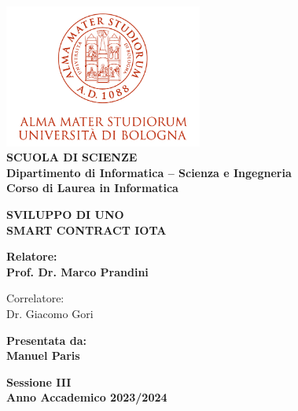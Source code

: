 \begin{titlepage}
\begin{center}
\includegraphics[width=2.56in]{figures/logo/logo_unibo.png}\\
\vspace{5mm}
{\small{\bf SCUOLA DI SCIENZE\\
\vspace{2mm}
Dipartimento di Informatica -- Scienza e Ingegneria\\
\vspace{2mm}
Corso di Laurea in Informatica }}
\end{center}
\vspace{11.9mm}
\begin{center}
{\LARGE{\bf SVILUPPO DI UNO\\
\vspace{5mm}
SMART CONTRACT IOTA}}
\end{center}
\vspace{11.9mm}
\par
\noindent
\begin{minipage}[t]{0.47\textwidth}
{\normalsize{\bf Relatore:\\
Prof. Dr. Marco Prandini

\vspace{5mm}
Correlatore:\\
Dr. Giacomo Gori\\
}}
\end{minipage}
\hfill
\begin{minipage}[t]{0.47\textwidth}\raggedleft
{\normalsize{\bf Presentata da:\\
Manuel Paris}}
\end{minipage}
\vspace{10mm} %
\begin{center}
{\normalsize{\bf Sessione III\\%
Anno Accademico 2023/2024}}%
\end{center}
\end{titlepage}
